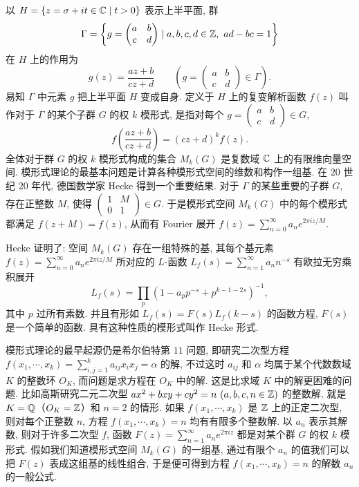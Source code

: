 以 $H=\{z=\sigma+it\in\mathbb{C}\mid t>0\}$ 表示上半平面, 群
\[
  \Gamma=\left\{g=\begin{pmatrix}a&b\\ c&d\end{pmatrix}\mid a,b,c,d\in\mathbb{Z},\ ad-bc=1\right\}
\]
在 $H$ 上的作用为
\[
  g(z)=\frac{az+b}{cz+d}\qquad\left(g=\begin{pmatrix}a&b\\ c&d\end{pmatrix}\in\Gamma\right).
\]
易知 $\Gamma$ 中元素 $g$ 把上半平面 $H$ 变成自身. 定义于 $H$ 上的复变解析函数 $f(z)$ 叫作对于 $\Gamma$ 的某个子群 $G$ 的权 $k$ 模形式, 是指对每个 $g=\begin{pmatrix}a&b\\ c&d\end{pmatrix}\in G$,
\[
  f\left(\frac{az+b}{cz+d}\right)=(cz+d)^kf(z).
\]
全体对于群 $G$ 的权 $k$ 模形式构成的集合 $M_k(G)$ 是复数域 $\mathbb{C}$ 上的有限维向量空间. 模形式理论的最基本问题是计算各种模形式空间的维数和构作一组基. 在 $20$ 世纪 $20$ 年代, 德国数学家 Hecke 得到一个重要结果. 对于 $\Gamma$ 的某些重要的子群 $G$, 存在正整数 $M$, 使得 $\begin{pmatrix}1&M\\ 0&1\end{pmatrix}\in G$. 于是模形式空间 $M_k(G)$ 中的每个模形式都满足 $f(z+M)=f(z)$, 从而有 Fourier 展开 $f(z)=\sum_{n=0}^{\infty}a_ne^{2\pi iz/M}$.

Hecke 证明了: 空间 $M_k(G)$ 存在一组特殊的基, 其每个基元素 $f(z)=\sum_{n=0}^{\infty}a_ne^{2\pi iz/M}$ 所对应的 $L$-函数 $L_f(s)=\sum_{n=1}^{\infty}a_nn^{-s}$ 有欧拉无穷乘积展开
\[
  L_f(s)=\prod_p(1-a_pp^{-s}+p^{k-1-2s})^{-1},
\]
其中 $p$ 过所有素数. 并且有形如 $L_f(s)=F(s)L_f(k-s)$ 的函数方程, $F(s)$ 是一个简单的函数. 具有这种性质的模形式叫作 Hecke 形式.

模形式理论的最早起源仍是希尔伯特第 $11$ 问题, 即研究二次型方程 $f(x_1,\cdots,x_k)=\sum_{i,j=1}^{k}a_{ij}x_ix_j=\alpha$ 的解, 不过这时 $a_{ij}$ 和 $\alpha$ 均属于某个代数数域 $K$ 的整数环 $O_K$, 而问题是求方程在 $O_K$ 中的解. 这是比求域 $K$ 中的解更困难的问题. 比如高斯研究二元二次型 $ax^2+bxy+cy^2=n\ (a,b,c,n\in\mathbb{Z})$ 的整数解, 就是 $K=\mathbb{Q}$（$O_K=\mathbb{Z}$）和 $n=2$ 的情形. 如果 $f(x_1,\cdots,x_k)$ 是 $\mathbb{Z}$ 上的正定二次型, 则对每个正整数 $n$, 方程 $f(x_1,\cdots,x_k)=n$ 均有有限多个整数解. 以 $a_n$ 表示其解数, 则对于许多二次型 $f$, 函数 $F(z)=\sum_{n=1}^{\infty}a_ne^{2\pi iz}$ 都是对某个群 $G$ 的权 $k$ 模形式. 假如我们知道模形式空间 $M_k(G)$ 的一组基, 通过有限个 $a_n$ 的值我们可以把 $F(z)$ 表成这组基的线性组合, 于是便可得到方程 $f(x_1,\cdots,x_k)=n$ 的解数 $a_n$ 的一般公式.

